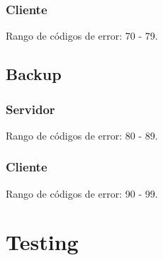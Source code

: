 \documentclass[12pt,a4paper, spanish]{article}
\begin{document}
\subsubsection{Cliente}
Rango de códigos de error: 70 - 79.

\subsection{Backup}

\subsubsection{Servidor}
Rango de códigos de error: 80 - 89.

\subsubsection{Cliente}
Rango de códigos de error: 90 - 99.

\newpage
\section{Testing}
\end{document}
